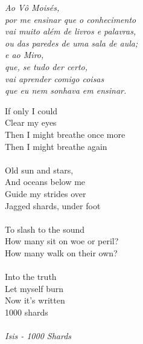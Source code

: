 \documentclass[12pt,twoside]{report}
\begin{document}
\newpage

\vspace*{0.7\textheight}
\begin{flushright}
  \emph{
    Ao Vô Moisés, \\ 
    por me ensinar que o conhecimento \\ 
    vai muito além de livros e palavras, \\
    ou das paredes de uma sala de aula; \\
    \vspace{0.5 cm}
    e ao Miro, \\
    que, se tudo der certo, \\ 
    vai aprender comigo coisas \\
    que eu nem sonhava em ensinar.
}
\end{flushright}

\newpage

\vspace*{0.2\textheight}
{\noindent 
If only I could \\
Clear my eyes \\
Then I might breathe once more \\
Then I might breathe again \\
\vspace{0.2 cm} \\
Old sun and stars, \\
And oceans below me \\
Guide my strides over \\
Jagged shards, under foot \\
\vspace{0.2 cm} \\
To slash to the sound \\
How many sit on woe or peril? \\
How many walk on their own? \\
\vspace{0.2 cm} \\
Into the truth \\
Let myself burn \\
Now it's written \\
1000 shards \\
\vspace{0.2 cm} \\
\emph {Isis - 1000 Shards}
}
\end{document}
